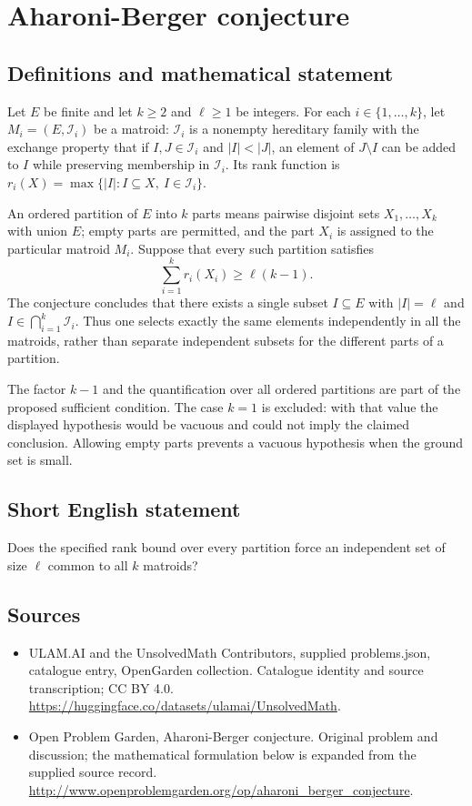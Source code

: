 \documentclass[11pt,a4paper]{article}
\begin{document}
\section*{Aharoni-Berger conjecture}\label{statement}

\subsection{Definitions and mathematical statement}
Let $E$ be finite and let $k\ge2$ and $\ell\ge1$ be integers.
For each $i\in\{1,\ldots,k\}$, let $M_i=(E,\mathcal I_i)$ be a matroid:
$\mathcal I_i$ is a nonempty hereditary family with the exchange property
that if $I,J\in\mathcal I_i$ and $|I|<|J|$, an element of $J\setminus I$
can be added to $I$ while preserving membership in $\mathcal I_i$.
Its rank function is
$r_i(X)=\max\{|I|:I\subseteq X,\ I\in\mathcal I_i\}$.

An ordered partition of $E$ into $k$ parts means pairwise disjoint sets
$X_1,\ldots,X_k$ with union $E$; empty parts are permitted, and the part
$X_i$ is assigned to the particular matroid $M_i$.
Suppose that every such partition satisfies
\[
 \sum_{i=1}^k r_i(X_i)\ge\ell(k-1).
\]
The conjecture concludes that there exists a single subset $I\subseteq E$
with $|I|=\ell$ and $I\in\bigcap_{i=1}^k\mathcal I_i$.
Thus one selects exactly the same elements independently in all the
matroids, rather than separate independent subsets for the different
parts of a partition.

The factor $k-1$ and the quantification over all ordered partitions are
part of the proposed sufficient condition. The case $k=1$ is excluded:
with that value the displayed hypothesis would be vacuous and could
not imply the claimed conclusion. Allowing empty parts prevents a
vacuous hypothesis when the ground set is small.
\subsection{Short English statement}
Does the specified rank bound over every partition force an independent set of size $\ell$ common to all $k$ matroids?
\subsection{Sources}
\begin{itemize}
\item[S1] ULAM.AI and the UnsolvedMath Contributors, supplied problems.json, catalogue entry, OpenGarden collection. Catalogue identity and source transcription; CC BY 4.0.
\url{https://huggingface.co/datasets/ulamai/UnsolvedMath}.
\item[S2] Open Problem Garden, Aharoni-Berger conjecture. Original problem and discussion; the mathematical formulation below is expanded from the supplied source record.
\url{http://www.openproblemgarden.org/op/aharoni_berger_conjecture}.
\end{itemize}
\end{document}
